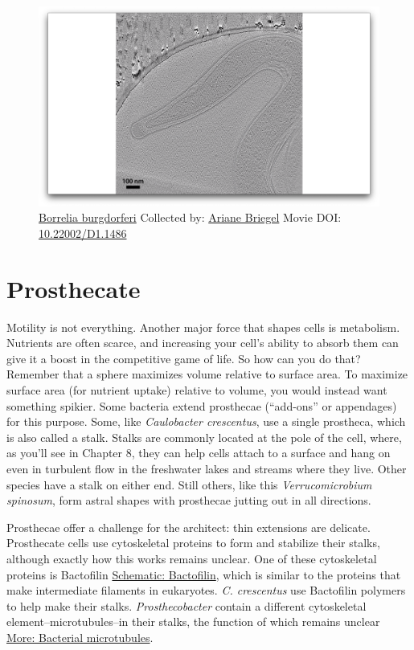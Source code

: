 \documentclass[]{tufte-book}
\begin{document}
\begin{figure}
\includegraphics{movie_stills/3_5a} \caption[\protect\hyperlink{tree}{Borrelia burgdorferi} Collected by:
\protect\hyperlink{ariane_briegel}{Ariane Briegel} Movie DOI:
\href{https://doi.org/10.22002/D1.1486}{10.22002/D1.1486}]{\protect\hyperlink{tree}{Borrelia burgdorferi} Collected by:
\protect\hyperlink{ariane_briegel}{Ariane Briegel} Movie DOI:
\href{https://doi.org/10.22002/D1.1486}{10.22002/D1.1486}}\label{fig:3-5a}
\end{figure}

\section{Prosthecate}\label{prosthecate}

Motility is not everything. Another major force that shapes cells is
metabolism. Nutrients are often scarce, and increasing your cell's
ability to absorb them can give it a boost in the competitive game of
life. So how can you do that? Remember that a sphere maximizes volume
relative to surface area. To maximize surface area (for nutrient uptake)
relative to volume, you would instead want something spikier. Some
bacteria extend prosthecae (``add-ons'' or appendages) for this purpose.
Some, like \emph{Caulobacter crescentus}, use a single prostheca, which
is also called a stalk. Stalks are commonly located at the pole of the
cell, where, as you'll see in Chapter 8, they can help cells attach to a
surface and hang on even in turbulent flow in the freshwater lakes and
streams where they live. Other species have a stalk on either end. Still
others, like this \emph{Verrucomicrobium spinosum}, form astral shapes
with prosthecae jutting out in all directions.

Prosthecae offer a challenge for the architect: thin extensions are
delicate. Prosthecate cells use cytoskeletal proteins to form and
stabilize their stalks, although exactly how this works remains unclear.
One of these cytoskeletal proteins is Bactofilin
\protect\hyperlink{Bactofilin}{Schematic: Bactofilin}, which is similar
to the proteins that make intermediate filaments in eukaryotes. \emph{C.
crescentus} use Bactofilin polymers to help make their stalks.
\emph{Prosthecobacter} contain a different cytoskeletal
element--microtubules--in their stalks, the function of which remains
unclear \protect\hyperlink{Bacterial_microtubules}{More: Bacterial
microtubules}.
\end{document}
